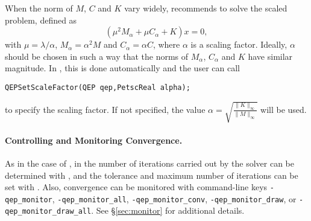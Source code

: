 When the norm of $M$, $C$ and $K$ vary widely, \cite{Tisseur:2000:BEC} recommends to solve the scaled problem, defined as 
\begin{equation}
(\mu^2M_\alpha+\mu C_\alpha+K)x=0,\label{eq:scaled}
\end{equation}
with $\mu=\lambda/\alpha$, $M_\alpha=\alpha^2M$ and $C_\alpha=\alpha C$, where $\alpha$ is a scaling factor. Ideally, $\alpha$ should be chosen in such a way that the norms of $M_\alpha$, $C_\alpha$ and $K$ have similar magnitude. In \slepc, this is done automatically and the user can call
	\begin{Verbatim}[fontsize=\small]
	QEPSetScaleFactor(QEP qep,PetscReal alpha);
	\end{Verbatim}
to specify the scaling factor. If not specified, the value $\alpha=\sqrt{\frac{\|K\|_\infty}{\|M\|_\infty}}$ will be used.

\paragraph{Controlling and Monitoring Convergence.}

As in the case of , in  the number of iterations carried out by the solver can be determined with , and the tolerance and maximum number of iterations can be set with . Also, convergence can be monitored with command-line keys \Verb!-qep_monitor!, \Verb!-qep_monitor_all!, \Verb!-qep_monitor_conv!, \Verb!-qep_monitor_draw!, or \Verb!-qep_monitor_draw_all!. See \S\ref{sec:monitor} for additional details.

